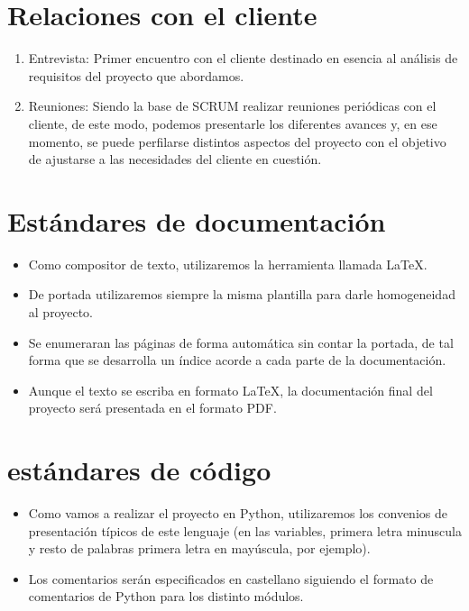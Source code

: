\section{Relaciones con el cliente}

\begin{enumerate}
	\item Entrevista: Primer encuentro con el cliente destinado en esencia al análisis de requisitos del proyecto que abordamos. 
	\item Reuniones: Siendo la base de SCRUM realizar reuniones periódicas con el cliente, de este modo, podemos presentarle los diferentes avances y, en ese momento, se puede perfilarse distintos aspectos del proyecto con el objetivo de ajustarse a las necesidades del cliente en cuestión.
\end{enumerate}

\section{Estándares de documentación}

\begin{itemize}
	\item Como compositor de texto, utilizaremos la herramienta llamada \LaTeX.
	\item De portada utilizaremos siempre la misma plantilla para darle homogeneidad al proyecto.
	\item Se enumeraran las páginas de forma automática sin contar la portada, de tal forma que se desarrolla un índice acorde a cada parte de la documentación.
	\item Aunque el texto se escriba en formato \LaTeX, la documentación final del proyecto será presentada en el formato PDF.
\end{itemize}

\section{estándares de código}

\begin{itemize}
	\item Como vamos a realizar el proyecto en Python, utilizaremos los convenios de presentación típicos de este lenguaje (en las variables, primera letra minuscula y resto de palabras primera letra en mayúscula, por ejemplo).
	\item Los comentarios serán especificados en castellano siguiendo el formato de comentarios de Python para los distinto módulos.
\end{itemize}


